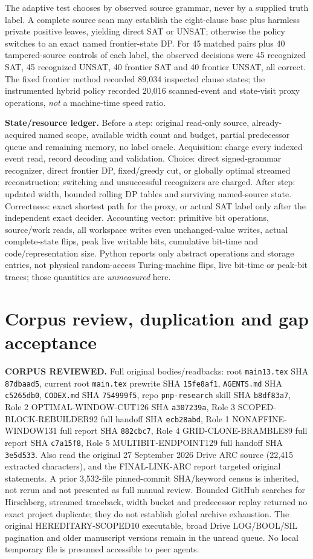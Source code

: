\documentclass[11pt]{article}
\begin{document}
The adaptive test chooses by observed source grammar, never by a supplied truth label. A complete source scan may establish the eight-clause base plus harmless private positive leaves, yielding direct SAT or UNSAT; otherwise the policy switches to an exact named frontier-state DP. For 45 matched pairs plus 40 tampered-source controls of each label, the observed decisions were 45 recognized SAT, 45 recognized UNSAT, 40 frontier SAT and 40 frontier UNSAT, all correct. The fixed frontier method recorded 89,034 inspected clause states; the instrumented hybrid policy recorded 20,016 scanned-event and state-visit proxy operations, \emph{not} a machine-time speed ratio.

\textbf{State/resource ledger.} Before a step: original read-only source, already-acquired named scope, available width count and budget, partial predecessor queue and remaining memory, no label oracle. Acquisition: charge every indexed event read, record decoding and validation. Choice: direct signed-grammar recognizer, direct frontier DP, fixed/greedy cut, or globally optimal streamed reconstruction; switching and unsuccessful recognizers are charged. After step: updated width, bounded rolling DP tables and surviving named-source state. Correctness: exact shortest path for the proxy, or actual SAT label only after the independent exact decider. Accounting vector: primitive bit operations, source/work reads, all workspace writes even unchanged-value writes, actual complete-state flips, peak live writable bits, cumulative bit-time and code/representation size. Python reports only abstract operations and storage entries, not physical random-access Turing-machine flips, live bit-time or peak-bit traces; those quantities are \emph{unmeasured} here.

\section{Corpus review, duplication and gap acceptance}
\textbf{CORPUS REVIEWED.} Full original bodies/readbacks: root \texttt{main13.tex} SHA \texttt{87dbaad5}, current root \texttt{main.tex} prewrite SHA \texttt{15fe8af1}, \texttt{AGENTS.md} SHA \texttt{c5265db0}, \texttt{CODEX.md} SHA \texttt{754999f5}, repo \texttt{pnp-research} skill SHA \texttt{b8df83a7}, Role 2 OPTIMAL-WINDOW-CUT126 SHA \texttt{a307239a}, Role 3 SCOPED-BLOCK-REBUILDER92 full handoff SHA \texttt{ecb28abd}, Role 1 NONAFFINE-WINDOW131 full report SHA \texttt{882cbc7}, Role 4 GRID-CLONE-BRAMBLE89 full report SHA \texttt{c7a15f8}, Role 5 MULTIBIT-ENDPOINT129 full handoff SHA \texttt{3e5d533}. Also read the original 27 September 2026 Drive ARC source (22,415 extracted characters), and the FINAL-LINK-ARC report targeted original statements. A prior 3,532-file pinned-commit SHA/keyword census is inherited, not rerun and not presented as full manual review. Bounded GitHub searches for Hirschberg, streamed traceback, width bucket and predecessor replay returned no exact project duplicate; they do not establish global archive exhaustion. The original HEREDITARY-SCOPED10 executable, broad Drive LOG/BOOL/SIL pagination and older manuscript versions remain in the unread queue. No local temporary file is presumed accessible to peer agents.
\end{document}
